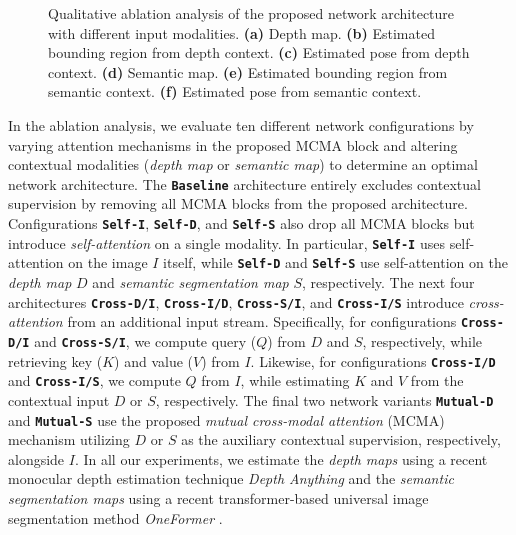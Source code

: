 \begin{figure*}[t]
\hfil
{}
\vspace{-0.75em}
\hfil
{}\hfil
{}\hfil
{}\hfil
{}\hfil
{}
\caption{Qualitative ablation analysis of the proposed network architecture with different input modalities. \textbf{(a)} Depth map. \textbf{(b)} Estimated bounding region from depth context. \textbf{(c)} Estimated pose from depth context. \textbf{(d)} Semantic map. \textbf{(e)} Estimated bounding region from semantic context. \textbf{(f)} Estimated pose from semantic context.}
\label{fig:ablation}
\end{figure*}

In the ablation analysis, we evaluate ten different network configurations by varying attention mechanisms in the proposed MCMA block and altering contextual modalities (\emph{depth map} or \emph{semantic map}) to determine an optimal network architecture. The \textbf{\texttt{Baseline}} architecture entirely excludes contextual supervision by removing all MCMA blocks from the proposed architecture. Configurations \textbf{\texttt{Self-I}}, \textbf{\texttt{Self-D}}, and \textbf{\texttt{Self-S}} also drop all MCMA blocks but introduce \emph{self-attention} on a single modality. In particular, \textbf{\texttt{Self-I}} uses self-attention on the image $I$ itself, while \textbf{\texttt{Self-D}} and \textbf{\texttt{Self-S}} use self-attention on the \emph{depth map} $D$ and \emph{semantic segmentation map} $S$, respectively. The next four architectures \textbf{\texttt{Cross-D/I}}, \textbf{\texttt{Cross-I/D}}, \textbf{\texttt{Cross-S/I}}, and \textbf{\texttt{Cross-I/S}} introduce \emph{cross-attention} from an additional input stream. Specifically, for configurations \textbf{\texttt{Cross-D/I}} and \textbf{\texttt{Cross-S/I}}, we compute query ($Q$) from $D$ and $S$, respectively, while retrieving key ($K$) and value ($V$) from $I$. Likewise, for configurations \textbf{\texttt{Cross-I/D}} and \textbf{\texttt{Cross-I/S}}, we compute $Q$ from $I$, while estimating $K$ and $V$ from the contextual input $D$ or $S$, respectively. The final two network variants \textbf{\texttt{Mutual-D}} and \textbf{\texttt{Mutual-S}} use the proposed \emph{mutual cross-modal attention} (MCMA) mechanism utilizing $D$ or $S$ as the auxiliary contextual supervision, respectively, alongside $I$. In all our experiments, we estimate the \emph{depth maps} using a recent monocular depth estimation technique \emph{Depth Anything} \cite{yang2024depth} and the \emph{semantic segmentation maps} using a recent transformer-based universal image segmentation method \emph{OneFormer} \cite{jain2023oneformer}.

